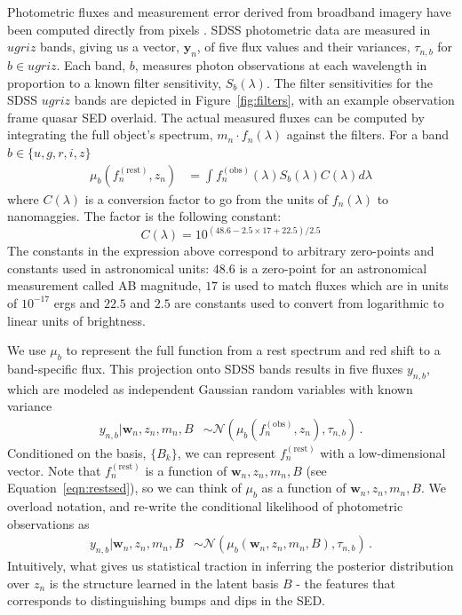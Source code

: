 \documentclass{article}
\begin{document}
Photometric fluxes and measurement error derived from broadband imagery have been computed directly from pixels \cite{luptonsdss}.  
SDSS photometric data are measured in $ugriz$ bands, giving us a vector, $\mathbf{y}_n$, of five flux values and their variances, $\tau_{n, b}$ for $b \in ugriz$. 
Each band, $b$, measures photon observations at each wavelength in proportion to a known filter sensitivity, $S_{b}(\lambda)$. 
The filter sensitivities for the SDSS $ugriz$ bands are depicted in Figure~\ref{fig:filters}, with an example observation frame quasar SED overlaid.  The actual measured fluxes can be computed by integrating the full object's spectrum, $m_n \cdot f_n(\lambda)$ against the filters.  For a band $b \in \{u, g, r, i, z \}$
\begin{align}
  \mu_b(f_n^{(\text{rest})}, z_n) &= \int f^{(\text{obs})}_n(\lambda) S_b(\lambda) C(\lambda) d \lambda 
\end{align}
where $C(\lambda)$ is a conversion factor to go from the units of $f_n(\lambda)$ to nanomaggies.
The factor is the following constant:
\begin{equation*}
C(\lambda) = 10^{(48.6-2.5\times17+22.5)/2.5}
\end{equation*}
The constants in the expression above correspond to arbitrary zero-points and constants
used in astronomical units: $48.6$ is a zero-point for an astronomical measurement called
AB magnitude, $17$ is used to match fluxes which are in units of $10^{-17}$ ergs and $22.5$ and
$2.5$ are constants used to convert from logarithmic to linear units of brightness.

 We use $\mu_b$ to represent the full function from 
a rest spectrum and red shift to a band-specific flux. This projection onto SDSS bands results in five fluxes $y_{n,b}$, which are modeled as independent Gaussian random variables with known variance
\begin{align}
  y_{n,b} | \mathbf{w}_n, z_n, m_n, B &\sim \mathcal{N}( \mu_b(f_n^{(\text{obs})}, z_n), \tau_{n,b} ) \, .
\end{align}
Conditioned on the basis, $\{B_k\}$, we can represent $f_n^{(\text{rest})}$ with a low-dimensional vector.  Note that $f_n^{(\text{rest})}$ is a function of $\mathbf{w}_n, z_n, m_n, B$ (see Equation~\ref{eqn:restsed}), so we can think of $\mu_b$
as a function of $\mathbf{w}_n, z_n, m_n, B$. We overload notation, and re-write the conditional likelihood of photometric observations as
\begin{align}
    y_{n,b} | \mathbf{w}_n, z_n, m_n, B &\sim \mathcal{N}( \mu_b(\mathbf{w}_n, z_n, m_n, B), \tau_{n,b} ) \, .
   \label{eq:phot}
\end{align}
Intuitively, what gives us statistical traction in inferring the posterior distribution over $z_n$ is the structure learned in the latent basis $B$ - the features that corresponds to distinguishing bumps and dips in the SED.  
\end{document}
